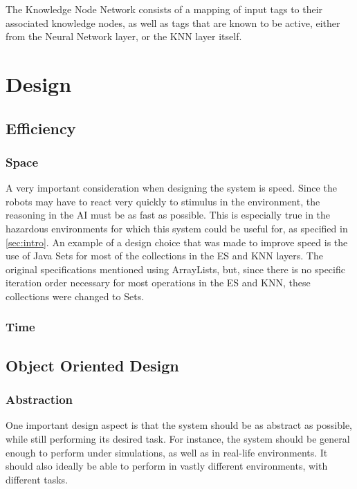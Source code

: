 \documentclass[titlepage,11pt]{article}
\begin{document}
The Knowledge Node Network consists of a mapping of input tags to their associated knowledge nodes, as well as tags that are known to be active, either from the Neural Network layer, or the KNN layer itself.

\section{Design}

\subsection{Efficiency}

\subsubsection{Space}

A very important consideration when designing the system is speed. Since the robots may have to react very quickly to stimulus in the environment, the reasoning in the AI must be as fast as possible. This is especially true in the hazardous environments for which this system could be useful for, as specified in \autoref{sec:intro}. An example of a design choice that was made to improve speed is the use of Java Sets for most of the collections in the ES and KNN layers. The original specifications mentioned using ArrayLists, but, since there is no specific iteration order necessary for most operations in the ES and KNN, these collections were changed to Sets.

\subsubsection{Time}

\subsection{Object Oriented Design}

\subsubsection{Abstraction}

One important design aspect is that the system should be as abstract as possible, while still performing its desired task. For instance, the system should be general enough to perform under simulations, as well as in real-life environments. It should also ideally be able to perform in vastly different environments, with different tasks.
\end{document}
